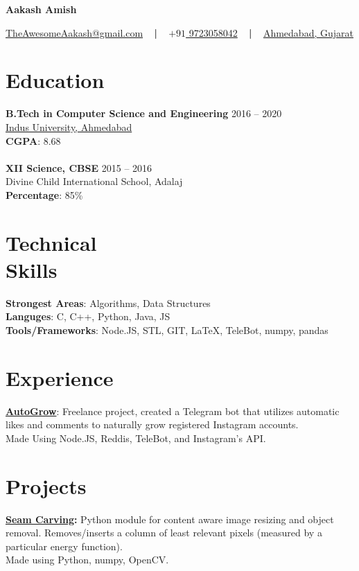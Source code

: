 \documentclass[margin, centered]{res}
\begin{document}
	\begin{center}
		\hspace{-\hoffset}
		\huge\bf{Aakash Amish}
	\end{center}
	\begin{center}
		\hspace{-\hoffset}
		\href{mailto:theawesomeaakash@gmail.com}{TheAwesomeAakash@gmail.com}
		~ \textbf{|} ~
		\href{tel:+919723058042}{\(+91\) 9723058042}
		~ \textbf{|} ~
		\href{https://goo.gl/maps/QqRrJzxewF82}{Ahmedabad, Gujarat}
	\end{center}

	\begin{resume}
		\section{Education}
			\textbf{B.Tech in Computer Science and Engineering} \hfill 2016 – 2020 \\
			\href{https://www.indusuni.ac.in/}{Indus University, Ahmedabad}\\
			\textbf{CGPA}: 8.68 \\ 
			\\
			\textbf{XII Science, CBSE} \hfill 2015 – 2016 \\
			Divine Child International School, Adalaj \\
			\textbf{Percentage}: 85\%
		\\		
		\section{Technical \\ Skills}
			\textbf{Strongest Areas}: Algorithms, Data Structures\\
			\textbf{Languges}: C, C++, Python, Java, JS\\
			\textbf{Tools/Frameworks}: Node.JS, STL, GIT, \LaTeX, TeleBot, numpy, pandas
		\\
		\section{Experience}
			\textbf{\href{https://t.me/AutoGrowV}{AutoGrow}}:
			Freelance project, created a Telegram bot that utilizes automatic likes and comments to naturally grow registered Instagram accounts.\\
			Made Using Node.JS, Reddis, TeleBot, and Instagram's API.
		\\
		\section{Projects}
			\textbf{\href{https://github.com/Spellstaker/Seam-Carving}{Seam Carving}:}
			Python module for content aware image resizing and object removal.
			Removes/inserts a column of least relevant pixels (measured by a particular energy function).\\
			Made using Python, numpy, OpenCV.
		\\

\end{resume}
\end{document}
